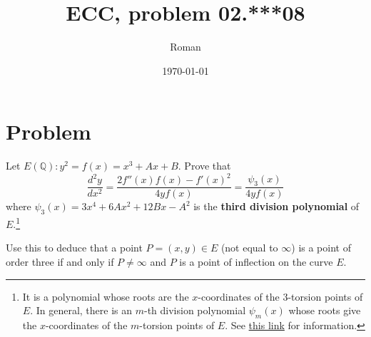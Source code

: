 \documentclass[12pt]{article}
\title{ECC, problem 02.***08}
\author{Roman}
\date{\today}
\begin{document}
\maketitle

\section*{Problem}

Let $E(\mathbb{Q}) : y^2 = f(x) = x^3 + Ax + B$. Prove that
\begin{equation*}
    \frac{d^2 y}{dx^2} = \frac{2 f''(x)f(x) - f'(x)^2}{4 y f(x)} = \frac{\psi_3(x)}{4 y f(x)}
\end{equation*}
where $\psi_3(x) = 3x^4 + 6Ax^2 + 12Bx - A^2$ is the \textbf{third division polynomial} of
$E$.\footnote{
    It is a polynomial whose roots are the $x$-coordinates of the 3-torsion points of $E$.
    In general, there is an $m$-th division polynomial $\psi_m(x)$ whose roots give the $x$-coordinates
    of the $m$-torsion points of $E$. See \href{https://en.wikipedia.org/wiki/Division_polynomials}{this link} for information.
}


Use this to deduce that a point $P = (x,y) \in E $ (not equal to $\infty$)
is a point of order three if and only if $P \neq \infty$ and $P$ is a point of inflection on the curve $E$.

\pagebreak
\end{document}

